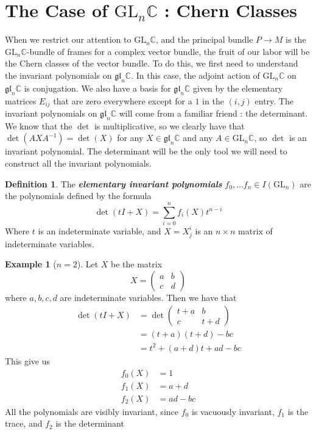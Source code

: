 \documentclass[psamsfonts, 12pt]{amsart}
\theoremstyle{definition}
\newtheorem{defn}[thm]{Definition}
\newtheorem{exmp}[thm]{Example}
\theoremstyle{remark}
\newcommand{\ib}[1]{\textbf{\textit{#1}}}
\newcommand{\C}{\mathbb{C}}
\newcommand{\GL}{\mathrm{GL}}
\newcommand{\gl}{\mathfrak{gl}}
\newcommand{\inv}{^{-1}}
\begin{document}
\section{The Case of $\GL_n\C$ : Chern Classes}
%
When we restrict our attention to $\GL_n\C$, and the principal bundle
$P \to M$ is the $\GL_n\C$-bundle of frames for a complex vector bundle,
the fruit of our labor will be the Chern classes of the vector bundle. To do this,
we first need to understand the invariant polynomials on $\gl_n\C$. In this case,
the adjoint action of $\GL_n\C$ on $\gl_n\C$ is conjugation. We also have a basis
for $\gl_n\C$ given by the elementary matrices $E_{ij}$ that are zero everywhere except
for a $1$ in the $(i,j)$ entry. The invariant polynomials on $\gl_n\C$ will come
from a familiar friend : the determinant. We know that the $\det$ is multiplicative,
so we clearly have that $\det(AXA\inv) = \det(X)$ for any $X \in \gl_n\C$ and
any $A \in \GL_n\C$, so $\det$ is an invariant polynomial. The determinant will
be the only tool we will need to construct all the invariant polynomials.
%
\begin{defn}
The \ib{elementary invariant polynomials} $f_0, \ldots f_n \in I(\GL_n)$ are
the polynomials defined by the formula
\[
\det(tI + X) = \sum_{i=0}^n f_i(X)t^{n-i}
\]
Where $t$ is an indeterminate variable, and $X = X^i_j$ is an $n\times n$ matrix
of indeterminate variables.
\end{defn}
%
\begin{exmp}[$n=2$]
Let $X$ be the matrix
\[
X = \begin{pmatrix}
a & b \\
c & d
\end{pmatrix}
\]
where $a,b,c,d$ are indeterminate variables. Then we have that
\begin{align*}
\det(tI + X) &= \det \begin{pmatrix}
t+a & b \\
c & t+d
\end{pmatrix} \\[5pt]
&= (t+a)(t+d) - bc \\
&= t^2 + (a+d)t +ad - bc
\end{align*}
This give us
\begin{align*}
f_0(X) &= 1 \\
f_1(X) &= a+d \\
f_2(X) &= ad - bc
\end{align*}
All the polynomials are visibly invariant, since $f_0$ is vacuously invariant,
$f_1$ is the trace, and $f_2$ is the determinant
\end{exmp}
\end{document}
